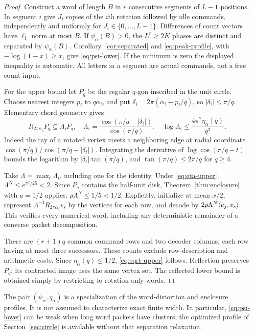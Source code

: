 \begin{proof}
Construct a word of length $B$ in $r$ consecutive segments of $L-1$ positions. In segment $i$ give $J_i$ copies of the $i$th rotation followed by idle commands, independently and uniformly for $J_i\in\{0,\ldots,L-1\}$. Differences of count vectors have $\ell_1$ norm at most $B$. If $\psi_\alpha(B)>0$, the $L^r\ge2K$ phases are distinct and separated by $\psi_\alpha(B)$. Corollary~\ref{cor:separated} and \eqref{eq:peak-profile}, with $-\log(1-x)\ge x$, give \eqref{eq:psi-lower}. If the minimum is zero the displayed inequality is automatic. All letters in a segment are actual commands, not a free count input.

For the upper bound let $P_q$ be the regular $q$-gon inscribed in the unit circle. Choose nearest integers $p_i$ to $q\alpha_i$, and put $\delta_i=2\pi(\alpha_i-p_i/q)$, so $|\delta_i|\le\pi/q$. Elementary chord geometry gives
\begin{equation}\label{eq:dilation}
 R_{2\pi\alpha_i}P_q\subseteq\Lambda_iP_q,
 \quad
 \Lambda_i=\frac{\cos(\pi/q-|\delta_i|)}{\cos(\pi/q)},
 \quad
 \log\Lambda_i\le\frac{4\pi^2\eta_\alpha(q)}{q^2}.
\end{equation}
Indeed the ray of a rotated vertex meets a neighboring edge at radial coordinate $\cos(\pi/q)/\cos(\pi/q-|\delta_i|)$. Integrating the derivative of $\log\cos(\pi/q-t)$ bounds the logarithm by $|\delta_i|\tan(\pi/q)$, and $\tan(\pi/q)\le2\pi/q$ for $q\ge4$.

Take $\Lambda=\max_i\Lambda_i$, including one for the identity. Under \eqref{eq:eta-upper}, $\Lambda^N\le e^{\pi^2/25}<2$. Since $P_q$ contains the half-unit disk, Theorem~\ref{thm:enclosure} with $a=1/2$ applies: $\rho\Lambda^N\le1/5<1/2$. Explicitly, initialize at mean $x/2$, represent $\Lambda^{-1}R_{2\pi\alpha_i}v_s$ by the vertices for each row, and decode by $2\rho\Lambda^N\langle e_j,v_s\rangle$. This verifies every numerical word, including any deterministic remainder of a converse packet decomposition.

There are $(r+1)q$ common command rows and two decoder columns, each row having at most three successors. These counts exclude row-description and arithmetic costs. Since $\eta_\alpha(q)\le1/2$, \eqref{eq:sqrt-upper} follows. Reflection preserves $P_q$; its contracted image uses the same vertex set. The reflected lower bound is obtained simply by restricting to rotation-only words.
\end{proof}

The pair $(\psi_\alpha,\eta_\alpha)$ is a specialization of the word-distortion and enclosure profiles. It is not assumed to characterize exact finite width. In particular, \eqref{eq:psi-lower} can be weak when long word packets have clusters; the optimized profile of Section~\ref{sec:circle} is available without that separation relaxation.

